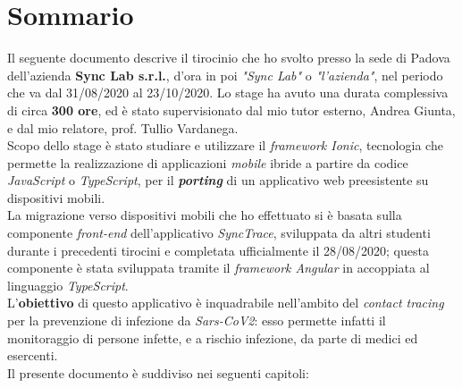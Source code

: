 
\cleardoublepage
{}
{}
\begingroup
\let\clearpage\relax
\let\cleardoublepage\relax
\let\cleardoublepage\relax

\chapter*{Sommario}

Il seguente documento descrive il tirocinio che ho svolto presso la sede di Padova dell'azienda \textbf{Sync Lab s.r.l.}, d'ora in poi \textit{"Sync Lab"} o \textit{"l'azienda"}, nel periodo che va dal 31/08/2020 al 23/10/2020. Lo stage ha avuto una durata complessiva di circa \textbf{300 ore}, ed è stato supervisionato dal mio tutor esterno, Andrea Giunta, e dal mio relatore, prof. Tullio Vardanega.\\
Scopo dello stage è stato studiare e utilizzare il \textit{framework Ionic}, tecnologia che permette la realizzazione di applicazioni \textit{mobile} ibride a partire da codice \textit{JavaScript} o \textit{TypeScript}, per il \textbf{\textit{porting}} di un applicativo web preesistente su dispositivi mobili. \\
La migrazione verso dispositivi mobili che ho effettuato si è basata sulla componente \textit{front-end} dell'applicativo \textit{SyncTrace}, sviluppata da altri studenti durante i precedenti tirocini e completata ufficialmente il 28/08/2020; questa componente è stata sviluppata tramite il \textit{framework Angular} in accoppiata al linguaggio \textit{TypeScript}. \\
L'\textbf{obiettivo} di questo applicativo è inquadrabile nell'ambito del \textit{contact tracing} per la prevenzione di infezione da \textit{Sars-CoV2}: esso permette infatti il monitoraggio di persone infette, e a rischio infezione, da parte di medici ed esercenti.\\
Il presente documento è suddiviso nei seguenti capitoli:
